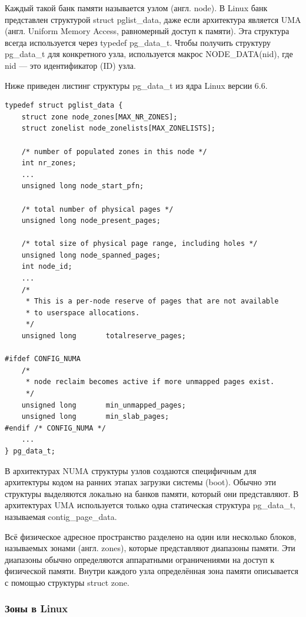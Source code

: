 Каждый такой банк памяти называется узлом (англ. node).
В Linux банк представлен структурой {struct pglist\_data}, даже если архитектура является UMA (англ. Uniform Memory Access, равномерный доступ к памяти).
Эта структура всегда используется через {typedef pg\_data\_t}.
Чтобы получить структуру {pg\_data\_t} для конкретного узла, используется макрос {NODE\_DATA(nid)}, где {nid} — это идентификатор (ID) узла.

Ниже приведен листинг структуры pg\_data\_t из ядра Linux версии 6.6.

\begin{lstlisting}[caption={struct pglist\_data}]
typedef struct pglist_data {
	struct zone node_zones[MAX_NR_ZONES];
	struct zonelist node_zonelists[MAX_ZONELISTS];

    /* number of populated zones in this node */
	int nr_zones;
    ...
	unsigned long node_start_pfn;

    /* total number of physical pages */
	unsigned long node_present_pages;

    /* total size of physical page range, including holes */
	unsigned long node_spanned_pages;
	int node_id;
    ...
	/*
	 * This is a per-node reserve of pages that are not available
	 * to userspace allocations.
	 */
	unsigned long		totalreserve_pages;

#ifdef CONFIG_NUMA
	/*
	 * node reclaim becomes active if more unmapped pages exist.
	 */
	unsigned long		min_unmapped_pages;
	unsigned long		min_slab_pages;
#endif /* CONFIG_NUMA */
    ...
} pg_data_t;
\end{lstlisting}

В архитектурах NUMA структуры узлов создаются специфичным для архитектуры кодом на ранних этапах загрузки системы (boot).
Обычно эти структуры выделяются локально на банков памяти, который они представляют.
В архитектурах UMA используется только одна статическая структура {pg\_data\_t}, называемая {contig\_page\_data}.

Всё физическое адресное пространство разделено на один или несколько блоков, называемых зонами (англ. zones), которые представляют диапазоны памяти.
Эти диапазоны обычно определяются аппаратными ограничениями на доступ к физической памяти.
Внутри каждого узла определённая зона памяти описывается с помощью структуры {struct zone}.~\cite{mem}

\subsubsection{Зоны в Linux}

